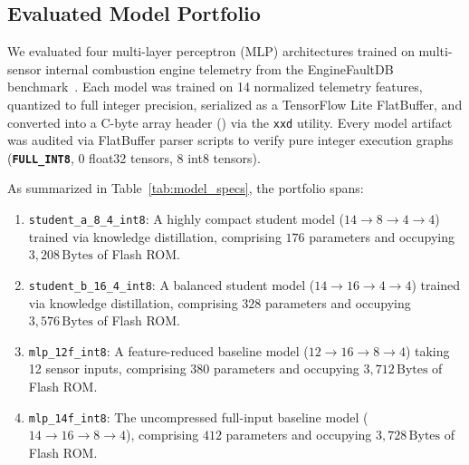 \documentclass[journal,10pt]{IEEEtran}
\begin{document}
\subsection{Evaluated Model Portfolio}
We evaluated four multi-layer perceptron (MLP) architectures trained on multi-sensor internal combustion engine telemetry from the EngineFaultDB benchmark~\cite{schizas2022tinyml}. Each model was trained on 14 normalized telemetry features, quantized to full integer precision, serialized as a TensorFlow Lite FlatBuffer, and converted into a C-byte array header () via the \texttt{xxd} utility. Every model artifact was audited via FlatBuffer parser scripts to verify pure integer execution graphs (\textbf{\texttt{FULL\_INT8}}, $0$ float32 tensors, $8$ int8 tensors).

As summarized in Table~\ref{tab:model_specs}, the portfolio spans:
\begin{enumerate}
    \item \texttt{student\_a\_8\_4\_int8}: A highly compact student model ($14 \rightarrow 8 \rightarrow 4 \rightarrow 4$) trained via knowledge distillation, comprising $176$ parameters and occupying $3,208\,\text{Bytes}$ of Flash ROM.
    \item \texttt{student\_b\_16\_4\_int8}: A balanced student model ($14 \rightarrow 16 \rightarrow 4 \rightarrow 4$) trained via knowledge distillation, comprising $328$ parameters and occupying $3,576\,\text{Bytes}$ of Flash ROM.
    \item \texttt{mlp\_12f\_int8}: A feature-reduced baseline model ($12 \rightarrow 16 \rightarrow 8 \rightarrow 4$) taking 12 sensor inputs, comprising $380$ parameters and occupying $3,712\,\text{Bytes}$ of Flash ROM.
    \item \texttt{mlp\_14f\_int8}: The uncompressed full-input baseline model ($14 \rightarrow 16 \rightarrow 8 \rightarrow 4$), comprising $412$ parameters and occupying $3,728\,\text{Bytes}$ of Flash ROM.
\end{enumerate}

\begin{table}[t]
\centering
\footnotesize
\renewcommand{\arraystretch}{0.92}
\caption{Evaluated \texttt{FULL\_INT8} TinyML Model Artifacts}
\label{tab:model_specs}
\end{table}
\end{document}
